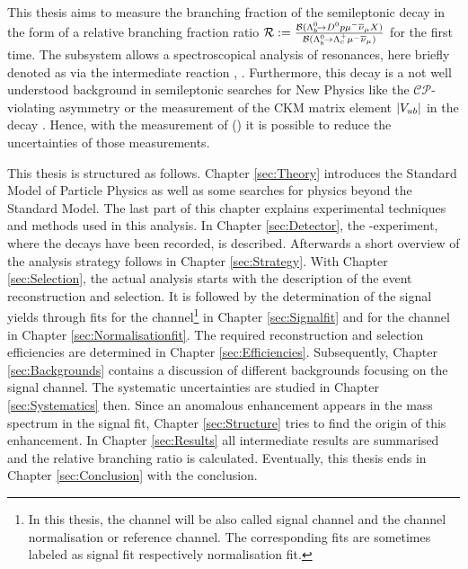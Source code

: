 This thesis aims to measure the branching fraction of the semileptonic decay \LbToDpmunuX in the form of a relative branching fraction ratio $\mathcal{R} := \frac{{\cal B}({{\Lambda}^0_{b}}\!\rightarrow {\ensuremath{{D}^0}}{\ensuremath{p}}{\ensuremath{\mu^-}}{\ensuremath{{\overline{\nu}}_\mu}} X)}{{\cal B}({{\Lambda}^0_{b}}\!\rightarrow {\ensuremath{{\Lambda}^+_{c}}}{\ensuremath{\mu^-}}{\ensuremath{{\overline{\nu}}_\mu}})}$ for the first time.
The \Dz\proton subsystem allows a spectroscopical analysis of \Lc resonances, here briefly denoted as \Lcstar via the intermediate reaction \decay{\Lb}{\Lcstar\mun\neumb}, \decay{\Lcstar}{\Dz\proton}.
Furthermore, this decay is a not well understood background in semileptonic searches for New Physics like the $\mathcal{CP}$-violating asymmetry \asld \cite{asld_LHCb} or the measurement of the CKM matrix element $|{V_{{u}{b}}}|$ in the decay \decay{\Lb}{\proton\mun\neumb} \cite{SL_Vub}.
Hence, with the measurement of \BR(\LbToDpmunuX) it is possible to reduce the uncertainties of those measurements.

This thesis is structured as follows.
Chapter \ref{sec:Theory} introduces the Standard Model of Particle Physics as well as some searches for physics beyond the Standard Model. The last part of this chapter explains experimental techniques and methods used in this analysis.
In Chapter \ref{sec:Detector}, the \lhcb-experiment, where the decays have been recorded, is described.
Afterwards a short overview of the analysis strategy follows in Chapter \ref{sec:Strategy}.
With Chapter \ref{sec:Selection}, the actual analysis starts with the description of the event reconstruction and selection.
It is followed by the determination of the signal yields through fits for the \LbToDpmunuX channel\footnote{In this thesis, the channel \LbToDpmunuX will be also called signal channel and the \LbToLcmunu channel normalisation or reference channel. The corresponding fits are sometimes labeled as signal fit respectively normalisation fit.}
in Chapter \ref{sec:Signalfit} and for the \LbToLcmunu channel in Chapter \ref{sec:Normalisationfit}.
The required reconstruction and selection efficiencies are determined in Chapter \ref{sec:Efficiencies}.
Subsequently, Chapter \ref{sec:Backgrounds} contains a discussion of different backgrounds focusing on the \LbToDpmunuX signal channel.
The systematic uncertainties are studied in Chapter \ref{sec:Systematics} then.
Since an anomalous enhancement appears in the \Dz\proton mass spectrum in the signal fit, Chapter \ref{sec:Structure} tries to find the origin of this enhancement.
In Chapter \ref{sec:Results} all intermediate results are summarised and the relative branching ratio \R is calculated.
Eventually, this thesis ends in Chapter \ref{sec:Conclusion} with the conclusion.

